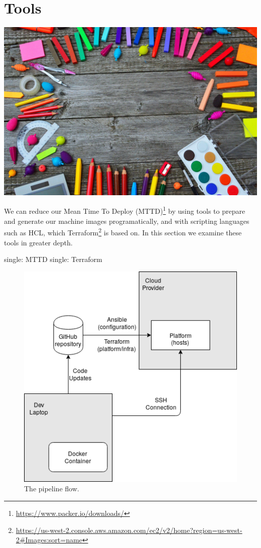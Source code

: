\chapter{Tools}

\includegraphics{../images/school-tools-3596680_1920.jpg}

We can reduce our Mean Time To Deploy (MTTD)\footnote{\url{https://www.packer.io/downloads/}}
by using tools to prepare and generate our machine images
programatically, and with scripting languages such as HCL, which
Terraform\footnote{\url{https://us-west-2.console.aws.amazon.com/ec2/v2/home?region=us-west-2\#Images:sort=name}}
is based on. In this section we examine these tools in greater depth.

single: MTTD single: Terraform

\begin{figure}
   \centering
   \includegraphics{../images/infra_flow.png}
   \caption{The pipeline flow.}
\end{figure}

